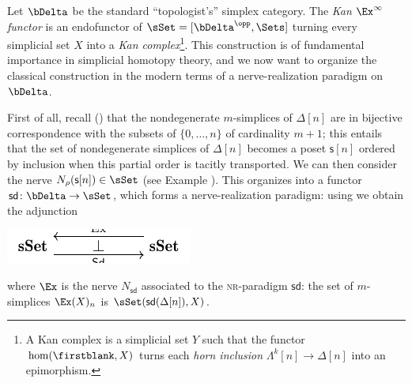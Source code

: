 \begin{example}\label{ex.sub}
Let $\bDelta$ be the standard ``topologist's'' simplex category. The \emph{Kan $\Ex^\infty$ functor} is an endofunctor of $\sSet = [\bDelta^\opp,\Sets]$ turning every simplicial set $X$ into a \emph{Kan complex}\footnote{A Kan complex is a simplicial set $Y$ such that the functor $\hom(\firstblank,X)$ turns each \emph{horn inclusion} $\Lambda^k[n]\to \Delta[n]$ into an epimorphism.}. This construction is of fundamental importance in simplicial homotopy theory, and we now want to organize the classical construction in the modern terms of a nerve\hyp{}realization paradigm on $\bDelta$.

First of all, recall (\cite{GoJ}) that the nondegenerate $m$-simplices of $\Delta[n]$ are in bijective correspondence with the subsets of $\{0,\dots,n\}$ of cardinality $m+1$; this entails that the set of nondegenerate simplices of $\Delta[n]$ becomes a poset $\textsf{s}[n]$ ordered by inclusion when this partial order is tacitly transported. We can then consider the nerve $N_\rho(\textsf{s}[n])\in\sSet$ (see Example ). This organizes into a functor $\textsf{sd}\colon \bDelta \to \sSet$, which forms a nerve\hyp{}realization paradigm: using \aprop{} we obtain the adjunction
\begin{center}
\includegraphics[scale=1]{figures/fig2}
\end{center}
where $\Ex$ is the nerve $N_\textsf{sd}$ associated to the \textsc{nr}\hyp{}paradigm $\textsf{sd}$: the set of $m$-simplices $\Ex(X)_n$ is $\sSet(\textsf{sd}(\Delta[n]), X)$.


\end{example}
